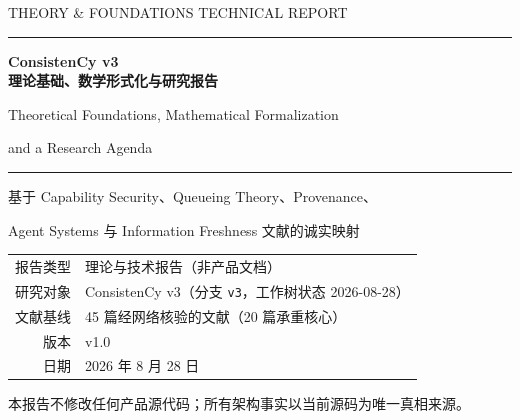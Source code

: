 \documentclass[UTF8,zihao=-4,a4paper,oneside,openany,fontset=windows]{ctexbook}
\theoremstyle{plain}
\theoremstyle{definition}
\theoremstyle{remark}
\theoremstyle{definition}
\newcommand{\tcode}[1]{\texttt{#1}}
\begin{document}
\begin{titlepage}
\centering
\vspace*{2.2cm}
{\color{inkgray}\small THEORY \& FOUNDATIONS TECHNICAL REPORT\par}
\vspace{0.8cm}
{\color{framegray}\rule{\textwidth}{1.2pt}\par}
\vspace{1.2cm}
{\Huge\bfseries ConsistenCy v3\\[0.5em] 理论基础、数学形式化与研究报告\par}
\vspace{1.0cm}
{\Large Theoretical Foundations, Mathematical Formalization\par}
{\Large and a Research Agenda\par}
\vspace{1.4cm}
{\color{framegray}\rule{0.618\textwidth}{0.6pt}\par}
\vspace{1.2cm}
{\large 基于 Capability Security、Queueing Theory、Provenance、\par}
{\large Agent Systems 与 Information Freshness 文献的诚实映射\par}
\vspace{2.4cm}
\begin{minipage}{0.8\textwidth}\centering\small
\begin{tabular}{rl}
报告类型 & 理论与技术报告（非产品文档）\\
研究对象 & ConsistenCy v3（分支 \tcode{v3}，工作树状态 2026-08-28）\\
文献基线 & 45 篇经网络核验的文献（20 篇承重核心）\\
版本 & v1.0\\
日期 & 2026 年 8 月 28 日\\
\end{tabular}
\end{minipage}
\vfill
{\color{inkgray}\small 本报告不修改任何产品源代码；所有架构事实以当前源码为唯一真相来源。\par}
\end{titlepage}
\end{document}
